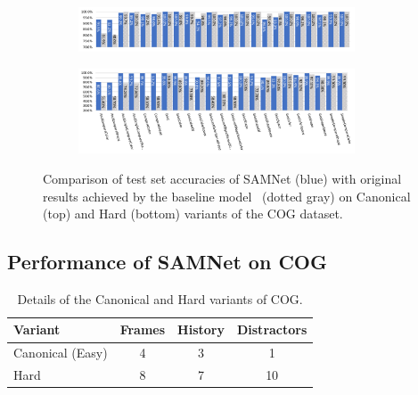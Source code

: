 \begin{figure}[htbp]
	\centering
	\begin{subfigure}{\textwidth}
		\centering
		\includegraphics[width=0.9\textwidth]{../results/samnet_cog_orig_canonical_no_labels.pdf}
	\end{subfigure}%
	\newline
	\begin{subfigure}{\textwidth}
		\centering
		\includegraphics[width=0.9\textwidth]{../results/samnet_cog_orig_hard.pdf}
	\end{subfigure}%
	\caption{Comparison of test set accuracies of SAMNet (blue) with original results achieved by the baseline model~\cite{yang2018dataset} (dotted gray) on Canonical (top) and Hard (bottom) variants of the COG dataset.}
	\label{fig:samnet_cog_detailed}
\end{figure}


\subsection{Performance of SAMNet on COG}
\label{sec:cog-baseline-compare}



\begin{table}[ht]
	\centering
		\begin{tabular}{lccc}
			\toprule
			Variant	& Frames & History	& Distractors \\
			\midrule
			Canonical (Easy) & 4 & 3 & 1\\
			Hard  & 8 & 7 & 10\\
			\bottomrule
		\end{tabular}
	\caption{Details of the Canonical and Hard variants of COG.}
	\label{tab:cog_variants}
\end{table}\vspace{5pt}

